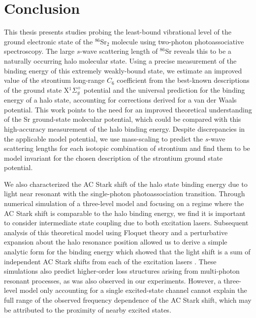 \chapter{Conclusion} \label{ch:conclusion}
This thesis presents studies probing the least-bound vibrational level of the ground electronic state of the $^{86}$Sr$_2$ molecule using two-photon photoassociative spectroscopy.
The large $s$-wave scattering length of $^{86}$Sr reveals this to be a naturally occurring halo molecular state.
Using a precise measurement of the binding energy of this extremely weakly-bound state, we estimate an improved value of the strontium long-range $C_6$ coefficient from the best-known descriptions of the ground state X$^1\Sigma_g^+$ potential and the universal prediction for the binding energy of a halo state, accounting for corrections derived for a van der Waals potential.
This work points to the need for an improved theoretical understanding of the Sr ground-state molecular potential, which could be compared with this high-accuracy measurement of the halo binding energy.
Despite discrepancies in the applicable model potential, we use mass-scaling to predict the $s$-wave scattering lengths for each isotopic combination of strontium and find them to be model invariant for the chosen description of the strontium ground state potential.

We also characterized the AC Stark shift of the halo state binding energy due to light near resonant with the single-photon photoassociation transition. 
Through numerical simulation of a three-level model and focusing on a regime where the AC Stark shift is comparable to the halo binding energy, we find it is important to consider intermediate state coupling due to both excitation lasers.
Subsequent analysis of this theoretical model using Floquet theory and a perturbative expansion about the halo resonance position allowed us to derive a simple analytic form for the binding energy which showed that the light shift is a sum of independent AC Stark shifts from each of the excitation lasers \cite{wfh00,Borkowski2009,Tojo2006}.
These simulations also predict higher-order loss structures arising from multi-photon resonant processes, as was also observed in our experiments.
However, a three-level model only accounting for a single excited-state channel \cite{Bohn1996} cannot explain the full range of the observed frequency dependence of the AC Stark shift, which may be attributed to the proximity of nearby excited states.

